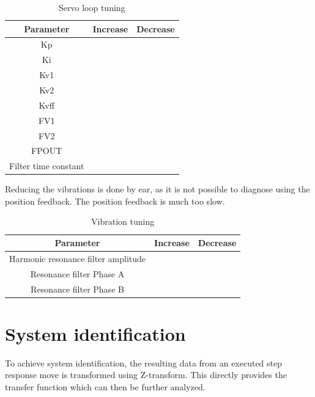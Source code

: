 \begin{table}[H]
	\centering
	\begin{tabular}{|c|c|c|}
		\hline
		\textbf{Parameter} & \textbf{Increase} & \textbf{Decrease} \\
		\hline
		Kp &  & \\
		\hline
		Ki &  & \\
		\hline
		Kv1 &  & \\
		\hline
		Kv2 &  & \\
		\hline
		Kvff &  & \\
		\hline
		FV1 &  & \\
		\hline
		FV2 &  & \\
		\hline
		FPOUT &  & \\
		\hline
		Filter time constant &  & \\
		\hline
	\end{tabular}
	\caption{Servo loop tuning}
	\label{tab:controller_tuning_servo}
\end{table}

Reducing the vibrations is done by ear, as it is not possible to diagnose using the position feedback. 
The position feedback is much too slow. 

\begin{table}[H]
	\centering
	\begin{tabular}{|c|c|c|}
		\hline
		\textbf{Parameter} & \textbf{Increase} & \textbf{Decrease} \\
		\hline
		Harmonic resonance filter amplitude &  & \\
		\hline
		Resonance filter Phase A &  & \\
		\hline
		Resonance filter Phase B &  & \\
		\hline
	\end{tabular}
	\caption{Vibration tuning}
	\label{tab:controller_tuning_vibration}
\end{table}

\section{System identification}

To achieve system identification, the resulting data from an executed step response move is transformed using Z-transform.
This directly provides the transfer function which can then be further analyzed. 

